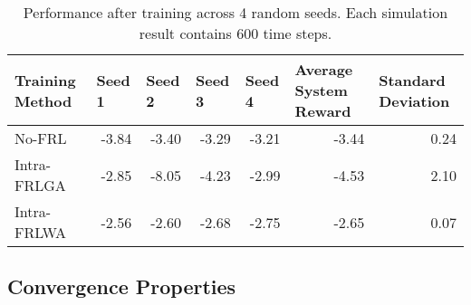 \begin{table}[H]
  \centering
  \scriptsize
  \caption{Performance after training across 4 random seeds. Each simulation result contains 600 time steps.}
    \begin{tabular}{lrrrrrr} \toprule
    \textbf{Training Method} & \multicolumn{1}{l}{\textbf{Seed 1}} & \multicolumn{1}{l}{\textbf{Seed 2}} & \multicolumn{1}{l}{\textbf{Seed 3}} & \multicolumn{1}{l}{\textbf{Seed 4}} & \multicolumn{1}{l}{\textbf{Average System Reward}} & \multicolumn{1}{l}{\textbf{Standard Deviation}} \\ \midrule
    No-FRL & -3.84 & -3.40 & -3.29 & -3.21 & -3.44 & 0.24 \\
    Intra-FRLGA & -2.85 & -8.05 & -4.23 & -2.99 & -4.53 & 2.10 \\
    Intra-FRLWA & -2.56 & -2.60 & -2.68 & -2.75 & -2.65 & 0.07 \\ \bottomrule
    \end{tabular}%
  \label{tab:intrafrl-summary}%
\end{table}%

 \subsection{Convergence Properties}
 
